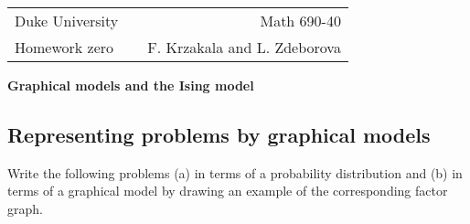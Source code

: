 \documentclass[a4paper,oneside,12pt]{article}
\begin{document}
\noindent

\begin{tabular}{lcr}
  Duke University & & Math 690-40 \\  
  Homework zero & \hspace{6.3cm} & F. Krzakala and L. Zdeborova\\ \hline
\end{tabular}

\begin{center}
  {\Large {\bf Graphical models and the Ising model}}
\end{center}

\subsection*{Representing problems by graphical models}

Write the following problems (a) in terms of a probability distribution and (b) in terms of a graphical model by drawing an example of the corresponding factor graph. 
\end{document}
